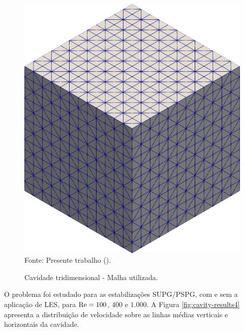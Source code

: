 \begin{figure}[h!]
    \centering
    \caption{Cavidade tridimensional - Malha utilizada.}
    \includegraphics[width=0.4\linewidth]{Figuras/cavity3D/malha.png}
    \\Fonte: Presente trabalho (\the\year).
    \label{fig:cavity-mesh3}
\end{figure}

O problema foi estudado para as estabilizações SUPG/PSPG, com e sem a aplicação de LES, para $\mathrm{Re}=100$, $400$ e $1.000$. A Figura \ref{fig:cavity-results4} apresenta a distribuição de velocidade sobre as linhas médias verticais e horizontais da cavidade.

